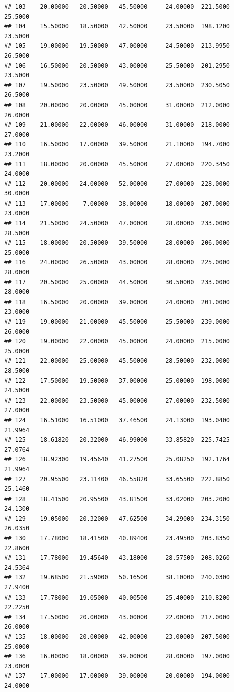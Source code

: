 \documentclass[]{article}
\begin{document}
\begin{verbatim}
## 103    20.00000   20.50000   45.50000     24.00000  221.5000     25.5000
## 104    15.50000   18.50000   42.50000     23.50000  198.1200     23.5000
## 105    19.00000   19.50000   47.00000     24.50000  213.9950     26.5000
## 106    16.50000   20.50000   43.00000     25.50000  201.2950     23.5000
## 107    19.50000   23.50000   49.50000     23.50000  230.5050     26.5000
## 108    20.00000   20.00000   45.00000     31.00000  212.0000     26.0000
## 109    21.00000   22.00000   46.00000     31.00000  218.0000     27.0000
## 110    16.50000   17.00000   39.50000     21.10000  194.7000     23.2000
## 111    18.00000   20.00000   45.50000     27.00000  220.3450     24.0000
## 112    20.00000   24.00000   52.00000     27.00000  228.0000     30.0000
## 113    17.00000    7.00000   38.00000     18.00000  207.0000     23.0000
## 114    21.50000   24.50000   47.00000     28.00000  233.0000     28.5000
## 115    18.00000   20.50000   39.50000     28.00000  206.0000     25.0000
## 116    24.00000   26.50000   43.00000     28.00000  225.0000     28.0000
## 117    20.50000   25.00000   44.50000     30.50000  233.0000     28.0000
## 118    16.50000   20.00000   39.00000     24.00000  201.0000     23.0000
## 119    19.00000   21.00000   45.50000     25.50000  239.0000     26.0000
## 120    19.00000   22.00000   45.00000     24.00000  215.0000     25.0000
## 121    22.00000   25.00000   45.50000     28.50000  232.0000     28.5000
## 122    17.50000   19.50000   37.00000     25.00000  198.0000     24.5000
## 123    22.00000   23.50000   45.00000     27.00000  232.5000     27.0000
## 124    16.51000   16.51000   37.46500     24.13000  193.0400     21.9964
## 125    18.61820   20.32000   46.99000     33.85820  225.7425     27.0764
## 126    18.92300   19.45640   41.27500     25.08250  192.1764     21.9964
## 127    20.95500   23.11400   46.55820     33.65500  222.8850     25.1460
## 128    18.41500   20.95500   43.81500     33.02000  203.2000     24.1300
## 129    19.05000   20.32000   47.62500     34.29000  234.3150     26.0350
## 130    17.78000   18.41500   40.89400     23.49500  203.8350     22.8600
## 131    17.78000   19.45640   43.18000     28.57500  208.0260     24.5364
## 132    19.68500   21.59000   50.16500     38.10000  240.0300     27.9400
## 133    17.78000   19.05000   40.00500     25.40000  210.8200     22.2250
## 134    17.50000   20.00000   43.00000     22.00000  217.0000     26.0000
## 135    18.00000   20.00000   42.00000     23.00000  207.5000     25.0000
## 136    16.00000   18.00000   39.00000     28.00000  197.0000     23.0000
## 137    17.00000   17.00000   39.00000     20.00000  194.0000     24.0000

\end{verbatim}
\end{document}
